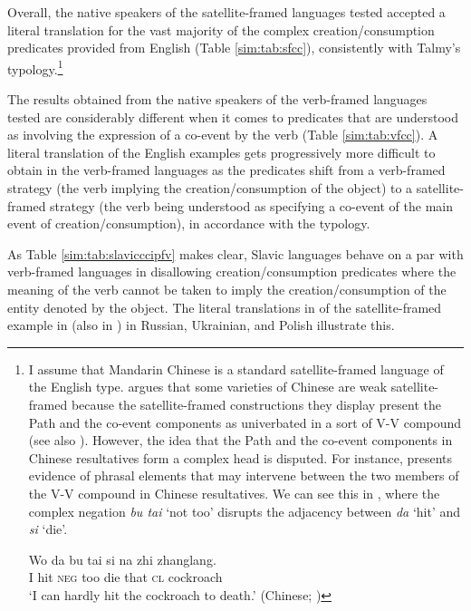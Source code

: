 \documentclass[output=paper,colorlinks,citecolor=brown]{langscibook}
\begin{document}
Overall, the native speakers of the satellite-framed languages tested accepted a literal translation for the vast majority of the complex creation/consumption predicates provided from English (Table \ref{sim:tab:sfcc}), consistently with Talmy's typology.\footnote{I
    assume that Mandarin Chinese is a standard satellite-framed language of the English type. \citet{Acedo-Matellan2016} argues that some varieties of Chinese are weak satellite-framed because the satellite-framed constructions they display present the Path and the co-event components as univerbated in a sort of V-V compound (see also \citealt{Fan2014}). However, the idea that the Path and the co-event components in Chinese resultatives form a complex head is disputed. For instance, \citet{Wang2010} presents evidence of phrasal elements that may intervene between the two members of the V-V compound in Chinese resultatives. We can see this in , where the complex negation \textit{bu tai} `not too' disrupts the adjacency between \textit{da} `hit' and \textit{si} `die'.


    \ea \label{Chinesebutai} \gll Wo da bu tai si na zhi zhanglang.\\
    I hit \textsc{neg} too die that \textsc{cl} cockroach\\
    \glt `I can hardly hit the cockroach to death.' \hfill (Chinese; \citealt[38]{Wang2010}) \z
}
\clearpage

The results obtained from the native speakers of the verb-framed languages tested are considerably different when it comes to predicates that are understood as involving the expression of a co-event by the verb (Table \ref{sim:tab:vfcc}). A literal translation of the English examples gets progressively more difficult to obtain in the verb-framed languages as the predicates shift from a verb-framed strategy (the verb implying the creation/consumption of the object) to a satellite-framed strategy (the verb being understood as specifying a co-event of the main event of creation/consumption), in accordance with the typology.

As Table \ref{sim:tab:slavicccipfv} makes clear, Slavic languages behave on a par with verb-framed languages in disallowing creation/consumption predicates where the meaning of the verb cannot be taken to imply the creation/consumption of the entity denoted by the object. The literal translations in  of the satellite-framed example in  (also in ) in Russian, Ukrainian, and Polish illustrate this.
\end{document}
